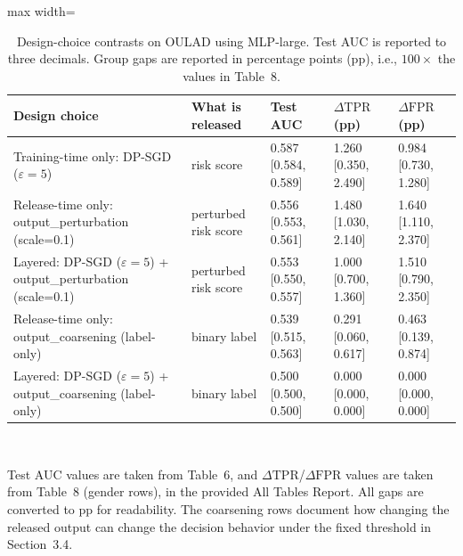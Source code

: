 \documentclass{edm_article}
\begin{document}
\begin{table}[t]
\centering
\caption{Design-choice contrasts on OULAD using MLP-large. Test AUC is reported to three decimals. Group gaps are reported in percentage points (pp), i.e., $100\times$ the values in Table~8.}
\label{tab:rq3_design_contrasts}
\begin{threeparttable}
\begin{adjustbox}{max width=\linewidth}
\begin{tabular}{@{}l l l l l@{}}
\toprule
Design choice & What is released & Test AUC & $\Delta\mathrm{TPR}$ (pp) & $\Delta\mathrm{FPR}$ (pp) \\
\midrule
Training-time only: DP-SGD ($\varepsilon{=}5$) &
risk score &
0.587 [0.584, 0.589] &
1.260 [0.350, 2.490] &
0.984 [0.730, 1.280] \\

Release-time only: output\_perturbation (scale=0.1) &
perturbed risk score &
0.556 [0.553, 0.561] &
1.480 [1.030, 2.140] &
1.640 [1.110, 2.370] \\

Layered: DP-SGD ($\varepsilon{=}5$) + output\_perturbation (scale=0.1) &
perturbed risk score &
0.553 [0.550, 0.557] &
1.000 [0.700, 1.360] &
1.510 [0.790, 2.350] \\

Release-time only: output\_coarsening (label-only) &
binary label &
0.539 [0.515, 0.563] &
0.291 [0.060, 0.617] &
0.463 [0.139, 0.874] \\

Layered: DP-SGD ($\varepsilon{=}5$) + output\_coarsening (label-only) &
binary label &
0.500 [0.500, 0.500] &
0.000 [0.000, 0.000] &
0.000 [0.000, 0.000] \\
\bottomrule
\end{tabular}
\end{adjustbox}
\\
\begin{flushleft}
\justifying
\footnotesize
Test AUC values are taken from Table~6, and $\Delta\mathrm{TPR}$/$\Delta\mathrm{FPR}$ values are taken from Table~8 (gender rows), in the provided All Tables Report. All gaps are converted to pp for readability. The coarsening rows document how changing the released output can change the decision behavior under the fixed threshold in Section~3.4.
\end{flushleft}
\end{threeparttable}
\end{table}
\end{document}

